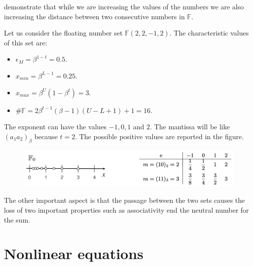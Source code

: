 \documentclass[12pt, a4paper]{report}
\newtheorem[style=M,bodystyle=\normalfont]{theorem}{Theorem}
\newtheorem[style=M,bodystyle=\normalfont]{corollary}{Corollary}
\newtheorem[style=M,bodystyle=\normalfont]{lemma}{Lemma}
\newtheorem[style=M,bodystyle=\normalfont]{definition}{Definition}
\begin{document}
    demonstrate that while we are increasing the values of the numbers we are also increasing the distance between two consecutive numbers in $\mathbb{F}$.
    \begin{example}
        Let us consider the floating number set $\mathbb{F}(2,2,-1,2)$. The characteristic values of this set are: 
        \begin{itemize}
            \item $\epsilon_M=\beta^{1-t}=0.5$.
            \item $x_{min}=\beta^{L-1}=0.25$.
            \item $x_{max}=\beta^U(1-\beta^t)=3$.
            \item $\#\mathbb{F}=2 \beta^{t-1}(\beta -1)(U-L+1)+1=16$. 
        \end{itemize}
        The exponent can have the values $-1,0,1$ and $2$. The mantissa will be like $(a_1a_2)_{\beta}$ because $t=2$. The possible positive values are
        reported in the figure. 
        \begin{figure}[H]
            \centering
            \includegraphics[width=0.9\linewidth]{images/numbers.png}
        \end{figure}
    \end{example}
    The other important aspect is that the passage between the two sets causes the loss of two important properties such as associativity end the 
    neutral number for the sum. 

    \newpage

\chapter{Nonlinear equations}
\end{document}
